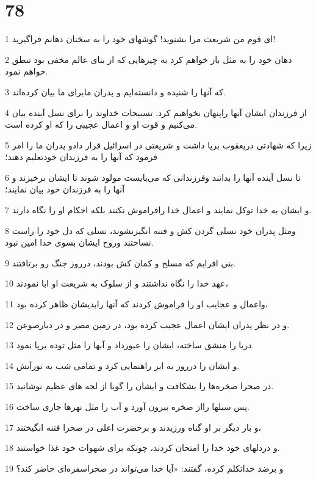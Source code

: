 \chapter{78}

\par 1 ای قوم من شریعت مرا بشنوید! گوشهای خود را به سخنان دهانم فراگیرید!
\par 2 دهان خود را به مثل باز خواهم کرد به چیزهایی که از بنای عالم مخفی بود تنطق خواهم نمود.
\par 3 که آنها را شنیده و دانسته‌ایم و پدران مابرای ما بیان کرده‌اند.
\par 4 از فرزندان ایشان آنها راپنهان نخواهیم کرد. تسبیحات خداوند را برای نسل آینده بیان می‌کنیم و قوت او و اعمال عجیبی را که او کرده است.
\par 5 زیرا که شهادتی دریعقوب برپا داشت و شریعتی در اسرائیل قرار دادو پدران ما را امر فرمود که آنها را به فرزندان خودتعلیم دهند؛
\par 6 تا نسل آینده آنها را بدانند وفرزندانی که می‌بایست مولود شوند تا ایشان برخیزند و آنها را به فرزندان خود بیان نمایند؛
\par 7 و ایشان به خدا توکل نمایند و اعمال خدا رافراموش نکنند بلکه احکام او را نگاه دارند.
\par 8 ومثل پدران خود نسلی گردن کش و فتنه انگیزنشوند، نسلی که دل خود را راست نساختند وروح ایشان بسوی خدا امین نبود.
\par 9 بنی افرایم که مسلح و کمان کش بودند، درروز جنگ رو برتافتند.
\par 10 عهد خدا را نگاه نداشتند و از سلوک به شریعت او ابا نمودند،
\par 11 واعمال و عجایب او را فراموش کردند که آنها رابدیشان ظاهر کرده بود،
\par 12 و در نظر پدران ایشان اعمال عجیب کرده بود، در زمین مصر و در دیارصوعن.
\par 13 دریا را منشق ساخته، ایشان را عبورداد و آبها را مثل توده برپا نمود.
\par 14 و ایشان را درروز به ابر راهنمایی کرد و تمامی شب به نورآتش. 
\par 15 در صحرا صخره‌ها را بشکافت و ایشان را گویا از لجه های عظیم نوشانید.
\par 16 پس سیلها رااز صخره بیرون آورد و آب را مثل نهرها جاری ساخت.
\par 17 و بار دیگر بر او گناه ورزیدند و برحضرت اعلی در صحرا فتنه انگیختند،
\par 18 و دردلهای خود خدا را امتحان کردند، چونکه برای شهوات خود غذا خواستند.
\par 19 و بر‌ضد خداتکلم کرده، گفتند: «آیا خدا می‌تواند در صحراسفره‌ای حاضر کند؟
